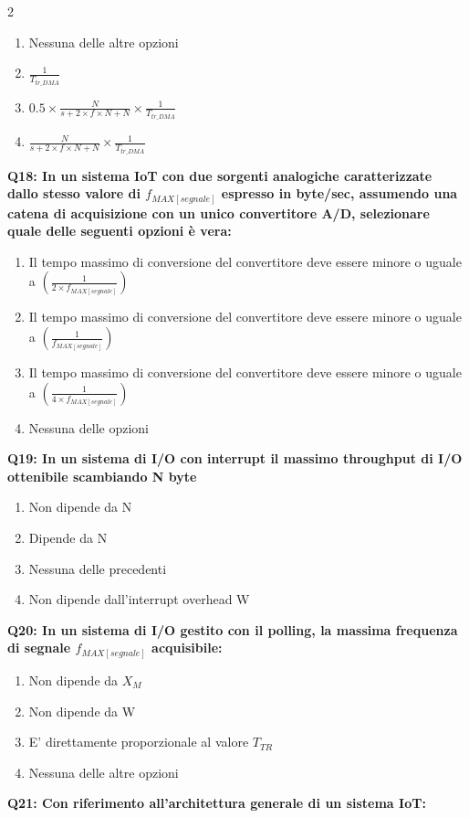 \documentclass[10pt]{article}
\begin{document}
\begin{multicols}{2}
\begin{enumerate}[label=\arabic*.]
\item Nessuna delle altre opzioni
\item $\frac{1}{T_{tr\_DMA}}$
\item $0.5 \times \frac{N}{s+ 2 \times f \times N + N} \times \frac{1}{T_{tr\_DMA}} $
\item $\frac{N}{s+ 2 \times f \times N + N} \times \frac{1}{T_{tr\_DMA}} $
\end{enumerate}
\textbf{Q18: In un sistema IoT con due sorgenti analogiche caratterizzate dallo stesso valore di $f_{MAX[segnale]}$ espresso in byte/sec, assumendo una catena di acquisizione con un unico convertitore A/D, selezionare quale delle seguenti opzioni è vera:}

\begin{enumerate}[label=\arabic*.]
\item Il tempo massimo di conversione del convertitore deve essere minore o uguale a $(\frac{1}{2 \times f_{MAX[segnale]}})$
\item Il tempo massimo di conversione del convertitore deve essere minore o uguale a $(\frac{1}{f_{MAX[segnale]}})$
\item Il tempo massimo di conversione del convertitore deve essere minore o uguale a $(\frac{1}{4 \times f_{MAX[segnale]}})$
\item Nessuna delle opzioni
\end{enumerate}
\textbf{Q19: In un sistema di I/O con interrupt il massimo throughput di I/O ottenibile scambiando N byte}

\begin{enumerate}[label=\arabic*.]
\item Non dipende da N
\item Dipende da N
\item Nessuna delle precedenti
\item Non dipende dall’interrupt overhead W
\end{enumerate}
\textbf{Q20: In un sistema di I/O gestito con il polling, la massima frequenza di segnale $f_{MAX[segnale]}$ acquisibile:}

\begin{enumerate}[label=\arabic*.]
\item Non dipende da $X_M$
\item Non dipende da W
\item E' direttamente proporzionale al valore $T_{TR}$
\item Nessuna delle altre opzioni
\end{enumerate}
\textbf{Q21: Con riferimento all’architettura generale di un sistema IoT:}


\end{multicols}
\end{document}
